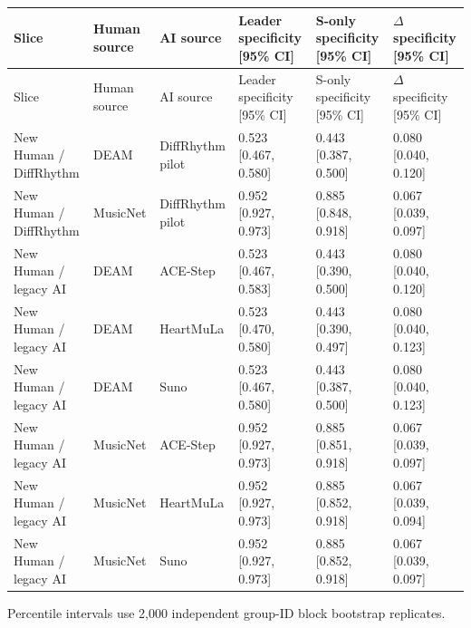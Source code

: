 \begin{longtable}{p{2.6cm}p{1.8cm}p{1.8cm}p{2.7cm}p{2.7cm}p{2.7cm}}
\toprule
Slice & Human source & AI source & Leader specificity [95\% CI] & S-only specificity [95\% CI] & $\Delta$ specificity [95\% CI] \\
\midrule
\endfirsthead
\toprule
Slice & Human source & AI source & Leader specificity [95\% CI] & S-only specificity [95\% CI] & $\Delta$ specificity [95\% CI] \\
\midrule
\endhead
New Human / DiffRhythm & DEAM & DiffRhythm pilot & 0.523 [0.467, 0.580] & 0.443 [0.387, 0.500] & 0.080 [0.040, 0.120] \\
New Human / DiffRhythm & MusicNet & DiffRhythm pilot & 0.952 [0.927, 0.973] & 0.885 [0.848, 0.918] & 0.067 [0.039, 0.097] \\
New Human / legacy AI & DEAM & ACE-Step & 0.523 [0.467, 0.583] & 0.443 [0.390, 0.500] & 0.080 [0.040, 0.120] \\
New Human / legacy AI & DEAM & HeartMuLa & 0.523 [0.470, 0.580] & 0.443 [0.390, 0.497] & 0.080 [0.040, 0.123] \\
New Human / legacy AI & DEAM & Suno & 0.523 [0.467, 0.580] & 0.443 [0.387, 0.500] & 0.080 [0.040, 0.123] \\
New Human / legacy AI & MusicNet & ACE-Step & 0.952 [0.927, 0.973] & 0.885 [0.851, 0.918] & 0.067 [0.039, 0.097] \\
New Human / legacy AI & MusicNet & HeartMuLa & 0.952 [0.927, 0.973] & 0.885 [0.852, 0.918] & 0.067 [0.039, 0.094] \\
New Human / legacy AI & MusicNet & Suno & 0.952 [0.927, 0.973] & 0.885 [0.852, 0.918] & 0.067 [0.039, 0.097] \\
\bottomrule
\end{longtable}
{\footnotesize Percentile intervals use 2,000 independent group-ID block bootstrap replicates.}
